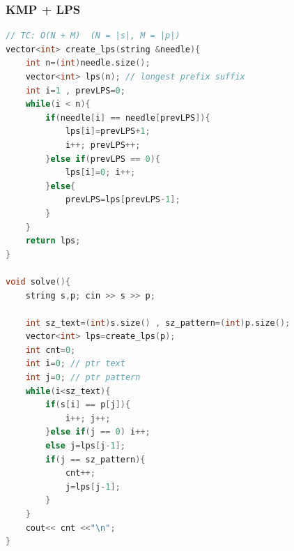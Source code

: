 \subsubsection{KMP + LPS}
\begin{lstlisting}[style=mystyle, language=C++]
// TC: O(N + M)  (N = |s|, M = |p|)
vector<int> create_lps(string &needle){
	int n=(int)needle.size();
	vector<int> lps(n); // longest prefix suffix
	int i=1 , prevLPS=0;
	while(i < n){
		if(needle[i] == needle[prevLPS]){
			lps[i]=prevLPS+1;
			i++; prevLPS++;
		}else if(prevLPS == 0){
			lps[i]=0; i++;
		}else{
			prevLPS=lps[prevLPS-1];
		}
	}
	return lps;
}

void solve(){
	string s,p; cin >> s >> p;

	int sz_text=(int)s.size() , sz_pattern=(int)p.size();
	vector<int> lps=create_lps(p);
	int cnt=0;
	int i=0; // ptr text
	int j=0; // ptr pattern
	while(i<sz_text){
		if(s[i] == p[j]){
			i++; j++;
		}else if(j == 0) i++;
		else j=lps[j-1];
		if(j == sz_pattern){
			cnt++;
			j=lps[j-1];
		}
	}
	cout<< cnt <<"\n";
}
\end{lstlisting}
